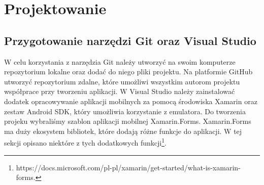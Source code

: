 	\newpage
\section{Projektowanie}		%

\subsection{Przygotowanie narzędzi Git oraz Visual Studio}

\hspace{1cm}W celu korzystania z narzędzia Git należy utworzyć na swoim komputerze repozytorium lokalne oraz dodać do niego pliki projektu. Na platformie GitHub utworzyć repozytorium zdalne, które umożliwi wszystkim autorom projektu współprace przy tworzeniu aplikacji.
\newline
W Visual Studio należy zainstalować dodatek opracowywanie aplikacji mobilnych za pomocą środowiska Xamarin oraz zestaw Android SDK, który umożliwia korzystanie z emulatora.
Do tworzenia projeku wybraliśmy szablon aplikacji mobilnej Xamarin.Forms.
Xamarin.Forms ma duży ekosystem bibliotek, które dodają różne funkcje do aplikacji. W tej sekcji opisano niektóre z tych dodatkowych funkcji\footnote{https://docs.microsoft.com/pl-pl/xamarin/get-started/what-is-xamarin-forms\cite{www1}.}.


